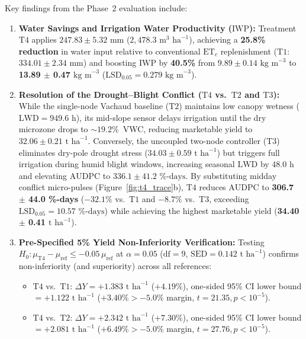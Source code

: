 \documentclass[10pt,twocolumn,a4paper]{article}
\begin{document}
Key findings from the Phase~2 evaluation include:
\begin{enumerate}\setlength{\itemsep}{1pt}\setlength{\parskip}{0pt}
  \item \textbf{Water Savings and Irrigation Water Productivity ($\mathrm{IWP}$):} Treatment $\mathrm{T4}$ applies $247.83 \pm 5.32\text{ mm}$ ($2,478.3\text{ m}^3\text{ ha}^{-1}$), achieving a \textbf{25.8\% reduction} in water input relative to conventional $\mathrm{ET}_c$ replenishment ($\mathrm{T1}$: $334.01 \pm 2.34\text{ mm}$) and boosting $\mathrm{IWP}$ by \textbf{40.5\%} from $9.89 \pm 0.14\text{ kg m}^{-3}$ to \textbf{13.89 $\pm$ 0.47 $\text{kg m}^{-3}$} ($\mathrm{LSD}_{0.05} = 0.279\text{ kg m}^{-3}$).
  \item \textbf{Resolution of the Drought--Blight Conflict ($\mathrm{T4}$ vs.\ $\mathrm{T2}$ and $\mathrm{T3}$):} While the single-node Vachaud baseline ($\mathrm{T2}$) maintains low canopy wetness ($\mathrm{LWD} = 949.6\text{ h}$), its mid-slope sensor delays irrigation until the dry microzone drops to $\sim 19.2\%$~VWC, reducing marketable yield to $32.06 \pm 0.21\text{ t ha}^{-1}$. Conversely, the uncoupled two-node controller ($\mathrm{T3}$) eliminates dry-pole drought stress ($34.03 \pm 0.59\text{ t ha}^{-1}$) but triggers full irrigation during humid blight windows, increasing seasonal $\mathrm{LWD}$ by $48.0\text{ h}$ and elevating $\mathrm{AUDPC}$ to $336.1 \pm 41.2\text{ \%-days}$. By substituting midday conflict micro-pulses (Figure~\ref{fig:t4_trace}b), $\mathrm{T4}$ reduces $\mathrm{AUDPC}$ to \textbf{306.7 $\pm$ 44.0 \%-days} (\textbf{$-32.1\%$} vs.\ $\mathrm{T1}$ and \textbf{$-8.7\%$} vs.\ $\mathrm{T3}$, exceeding $\mathrm{LSD}_{0.05} = 10.57\text{ \%-days}$) while achieving the highest marketable yield (\textbf{34.40 $\pm$ 0.41 $\text{t ha}^{-1}$}).
  \item \textbf{Pre-Specified 5\% Yield Non-Inferiority Verification:} Testing $H_0: \mu_{\mathrm{T4}} - \mu_{\text{ref}} \le -0.05\,\mu_{\text{ref}}$ at $\alpha = 0.05$ ($\mathrm{df}=9$, $\mathrm{SED} = 0.142\text{ t ha}^{-1}$) confirms non-inferiority (and superiority) across all references:
  \begin{itemize}\setlength{\itemsep}{0pt}
    \item $\mathrm{T4}$ vs.\ $\mathrm{T1}$: $\Delta Y = +1.383\text{ t ha}^{-1}$ ($+4.19\%$), one-sided 95\% CI lower bound $= +1.122\text{ t ha}^{-1}$ ($+3.40\% > -5.0\%$ margin, $t = 21.35, p < 10^{-5}$).
    \item $\mathrm{T4}$ vs.\ $\mathrm{T2}$: $\Delta Y = +2.342\text{ t ha}^{-1}$ ($+7.30\%$), one-sided 95\% CI lower bound $= +2.081\text{ t ha}^{-1}$ ($+6.49\% > -5.0\%$ margin, $t = 27.76, p < 10^{-5}$).

\end{itemize}
\end{enumerate}
\end{document}
